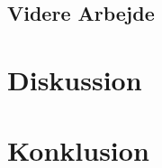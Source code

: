 \section{Videre Arbejde}\label{sec:videre-arbejde-fa}


\chapter{Diskussion}


\chapter{Konklusion}




\label{bib:mybiblio}

\appendix

